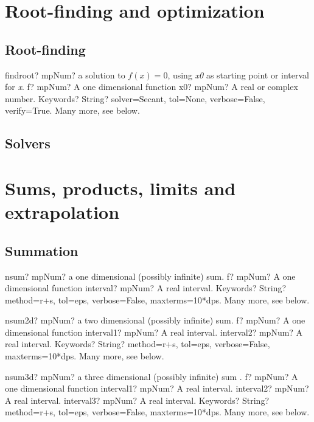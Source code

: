 \documentclass[12pt,a4paper,openany]{book}
\begin{document}
\chapter{Root-finding and optimization}

\section{Root-finding}

\begin{mpFunctionsExtract}
\mpFunctionThree
{findroot? mpNum?  a solution to $f(x)=0$, using \textit{x0} as starting point or interval for \textit{x}.}
{f? mpNum? A one dimensional function}
{x0? mpNum? A real or complex number.}
{Keywords? String? solver=Secant, tol=None, verbose=False, verify=True. Many more, see below.}
\end{mpFunctionsExtract}

\section{Solvers}

\chapter{Sums, products, limits and extrapolation}

\section{Summation}

\begin{mpFunctionsExtract}
\mpFunctionThree
{nsum? mpNum? a one dimensional (possibly infinite) sum.}
{f? mpNum? A one dimensional function}
{interval? mpNum? A real interval.}
{Keywords? String? method=r+s, tol=eps, verbose=False, maxterms=10*dps. Many more, see below.}
\end{mpFunctionsExtract}

\begin{mpFunctionsExtract}
\mpFunctionFour
{nsum2d? mpNum? a two dimensional (possibly infinite) sum.}
{f? mpNum? A one dimensional function}
{interval1? mpNum? A real interval.}
{interval2? mpNum? A real interval.}
{Keywords? String? method=r+s, tol=eps, verbose=False, maxterms=10*dps. Many more, see below.}
\end{mpFunctionsExtract}

\begin{mpFunctionsExtract}
\mpFunctionFive
{nsum3d? mpNum? a three dimensional (possibly infinite) sum .}
{f? mpNum? A one dimensional function}
{interval1? mpNum? A real interval.}
{interval2? mpNum? A real interval.}
{interval3? mpNum? A real interval.}
{Keywords? String? method=r+s, tol=eps, verbose=False, maxterms=10*dps. Many more, see below.}
\end{mpFunctionsExtract}
\end{document}
